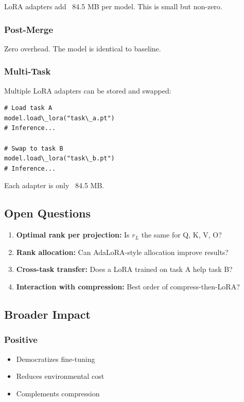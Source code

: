LoRA adapters add ~84.5 MB per model. This is small but 
non-zero.

\subsubsection{Post-Merge}

Zero overhead. The model is identical to baseline.

\subsubsection{Multi-Task}

Multiple LoRA adapters can be stored and swapped:

\begin{lstlisting}
# Load task A
model.load\_lora("task\_a.pt")
# Inference...

# Swap to task B
model.load\_lora("task\_b.pt")
# Inference...
\end{lstlisting}

Each adapter is only ~84.5 MB.

\subsection{Open Questions}

\begin{enumerate}
\item \textbf{Optimal rank per projection:} Is $r_L$ the same for Q, K, V, O?
\item \textbf{Rank allocation:} Can AdaLoRA-style allocation improve results?
\item \textbf{Cross-task transfer:} Does a LoRA trained on task A help task B?
\item \textbf{Interaction with compression:} Best order of compress-then-LoRA?

\end{enumerate}
\subsection{Broader Impact}

\subsubsection{Positive}
\begin{itemize}
\item Democratizes fine-tuning
\item Reduces environmental cost
\item Complements compression

\end{itemize}

